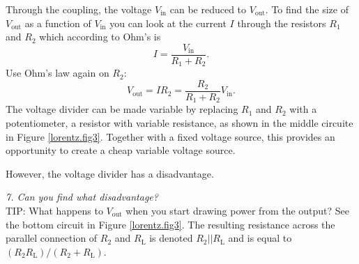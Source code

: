 \documentclass[../Elmag-labhefte-2020.tex]{subfiles}
\begin{document}
        
        

%
Through the coupling, the voltage $V_\mathrm{in}$ can be reduced to $V_\mathrm{out}$. To find the size of $V_\mathrm{out}$ as a function of $V_\mathrm{in}$ you can look at the current $I$ through the resistors $R_1$ and $R_2$ which according to Ohm's is
\begin{equation}
    I = \frac{V_\mathrm{in}}{R_1 + R_2} .
\end{equation}
Use Ohm's law again on $R_2$:
\begin{equation}
    V_\mathrm{out} 
        = I  R_2 
        = \frac{R_2}{R_1 + R_2} V_\mathrm{in}.
\end{equation}
The voltage divider can be made variable by replacing $R_1$ and $R_2$ with a potentiometer, a resistor with variable resistance, as shown in the middle circuite in Figure \ref{lorentz.fig3}.
Together with a fixed voltage source, this provides an opportunity to create a cheap variable voltage source.

However, the voltage divider has a disadvantage.

\emph{ 7. Can you find what disadvantage? }\\
TIP: What happens to $V_\mathrm{out}$ when you start drawing power from the output? See the bottom circuit in Figure \ref{lorentz.fig3}. The resulting resistance across the parallel connection of $R_2$ and $R_\mathrm{L}$ is denoted $R_2||R_\mathrm{L}$ and is equal to $ (R_2R_\mathrm{L})/(R_2 + R_\mathrm{L})$.
\end{document}
